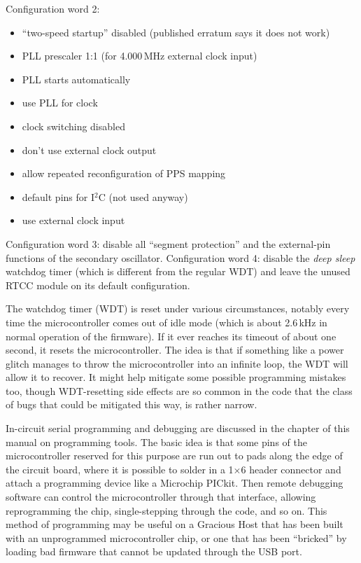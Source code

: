 Configuration word 2:
\begin{itemize}
  \item ``two-speed startup'' disabled (published erratum says it does not
  work)
  \item PLL prescaler 1:1 (for 4.000\,MHz external clock input)
  \item PLL starts automatically
  \item use PLL for clock
  \item clock switching disabled
  \item don't use external clock output
  \item allow repeated reconfiguration of PPS mapping
  \item default pins for I$^2$C (not used anyway)
  \item use external clock input
\end{itemize}

Configuration word 3:  disable all ``segment protection'' and the
external-pin functions of the secondary oscillator.  Configuration word
4:  disable the \emph{deep sleep} watchdog timer (which is different from
the regular WDT) and leave the unused RTCC
module on its default configuration.

The watchdog timer (WDT) is reset under various circumstances, notably every
time the microcontroller comes out of idle mode (which is about 2.6\,kHz in
normal operation of the firmware).  If it ever reaches its timeout of about
one second, it resets the microcontroller.  The idea is that if something
like a power glitch manages to throw the microcontroller into an infinite
loop, the WDT will allow it to recover.  It might help mitigate some
possible programming mistakes too, though WDT-resetting side effects are so
common in the code that the class of bugs that could be mitigated this way,
is rather narrow.

In-circuit serial programming and debugging are discussed in the chapter of
this manual on programming tools.  The basic idea is that some pins of the
microcontroller reserved for this purpose are run out to pads along the edge
of the circuit board, where it is possible to solder in a 1$\times$6 header
connector and attach a programming device like a Microchip PICkit. 
Then remote debugging software can control the microcontroller through that
interface, allowing reprogramming the chip, single-stepping through the
code, and so on.  This method of programming may be useful on a Gracious
Host that has been built with an unprogrammed microcontroller chip, or one
that has been ``bricked'' by loading bad firmware that cannot be updated
through the USB port.

